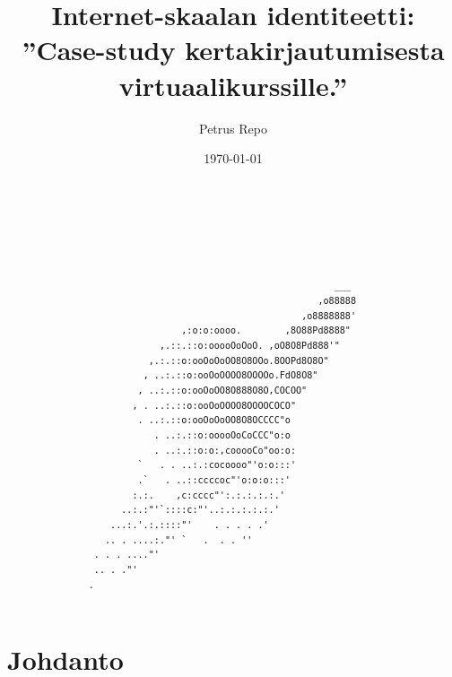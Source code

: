 \documentclass[finnish,gradu]{tktltiki}
\begin{document}
\title{Internet-skaalan identiteetti:
    \\ ''Case-study kertakirjautumisesta virtuaalikurssille.''}

\author{Petrus Repo}
\date{\today}
\maketitle

\onehalfspacing

\subject{Tietojenkäsittelytiede}


\begin{abstract}
  \begin{singlespacing}
  \begin{verbatim}






                                                        ___
                                                     ,o88888
                                                  ,o8888888'
                            ,:o:o:oooo.        ,8O88Pd8888"
                        ,.::.::o:ooooOoOoO. ,oO8O8Pd888'"
                      ,.:.::o:ooOoOoOO8O8OOo.8OOPd8O8O"
                     , ..:.::o:ooOoOOOO8OOOOo.FdO8O8"
                    , ..:.::o:ooOoOO8O888O8O,COCOO"
                   , . ..:.::o:ooOoOOOO8OOOOCOCO"
                    . ..:.::o:ooOoOoOO8O8OCCCC"o
                       . ..:.::o:ooooOoCoCCC"o:o
                       . ..:.::o:o:,cooooCo"oo:o:
                    `   . . ..:.:cocoooo"'o:o:::'
                    .`   . ..::ccccoc"'o:o:o:::'
                   :.:.    ,c:cccc"':.:.:.:.:.'
                 ..:.:"'`::::c:"'..:.:.:.:.:.'
               ...:.'.:.::::"'    . . . . .'
              .. . ....:."' `   .  . . ''
            . . . ...."'
            .. . ."'
           .

  \end{verbatim}
  \end{singlespacing}
\end{abstract}

\setcounter{tocdepth}{3}
\mytableofcontents

\section{Johdanto} %
\label{sec:johdanto}
\end{document}
